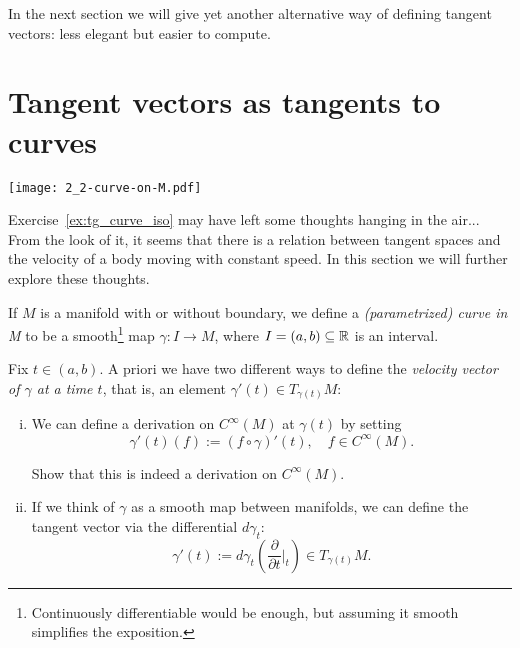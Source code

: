 In the next section we will give yet another alternative way of defining tangent vectors: less elegant but easier to compute.


\section{Tangent vectors as tangents to curves}

\begin{marginfigure}[1em]
  \texttt{[image: 2\_2-curve-on-M.pdf]}
\end{marginfigure}

Exercise~\ref{ex:tg_curve_iso} may have left some thoughts hanging in the air...
From the look of it, it seems that there is a relation between tangent spaces and the velocity of a body moving with constant speed.
In this section we will further explore these thoughts.

\begin{definition}
  If $M$ is a manifold with or without boundary, we define a \emph{(parametrized) curve in M} to be a smooth\footnote{Continuously differentiable would be enough, but assuming it smooth simplifies the exposition.} map $\gamma : I \to M$, where $I=(a,b)\subseteq\mathbb{R}$ is an interval.
\end{definition}

Fix $t\in(a,b)$.
A priori we have two different ways to define the \emph{velocity vector of $\gamma$ at a time $t$}, that is, an element $\gamma'(t) \in T_{\gamma(t)}M$:
\begin{enumerate}[(i)]
  \item We can define a derivation on $C^\infty(M)$ at $\gamma(t)$ by setting
        \begin{equation}\label{eq:tg_curve_der}
          \gamma'(t) (f) := (f\circ\gamma)'(t), \quad f\in C^\infty(M).
        \end{equation}
        \begin{exercise}
          Show that this is indeed a derivation on $C^\infty(M)$.
        \end{exercise}
  \item If we think of $\gamma$ as a smooth map between manifolds, we can define the tangent vector via the differential $d\gamma_t$:
        \begin{equation}\label{eq:tg_curve_diff}
          \gamma'(t):= d\gamma_t\left(\frac{\partial}{\partial t}\Big|_t\right) \in T_{\gamma(t)}M.
        \end{equation}
\end{enumerate}

